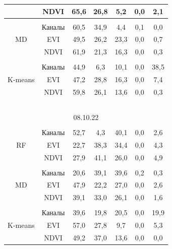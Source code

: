 \begin{table}
\begin{center}
\begin{tabular}{|c|c|c|c|c|c|c|}
&NDVI&65,6&26,8&\hphantom{9}5,2&0,0&2,1\\

\hline

&&&&&&\\[-10pt]

&Каналы&60,5&34,9&\hphantom{9}4,4&0,1&0,0\\

MD&EVI&49,5&26,2&23,3&0,0&0,7\\

&NDVI&61,9&21,3&16,3&0,0&0,3\\

\hline

&&&&&&\\[-10pt]

&Каналы&44,9&\hphantom{9}6,3&10,1&0,0&38,5\hphantom{9}\\

K-means&EVI&47,2&28,8&16,3&0,0&7,4\\

&NDVI&59,8&26,1&13,6&0,0&0,3\\

\hline

\multicolumn{7}{|c|}{\ }\\[-10pt]

\multicolumn{7}{|c|}{08.10.22}\\

\hline

&&&&&&\\[-10pt]

&Каналы&52,7&\hphantom{9}4,3&40,1&0,0&2,6\\

RF&EVI&22,7&38,3&34,4&0,0&4,3\\

&NDVI&27,9&41,1&26,0&0,0&4,9\\

\hline

&&&&&&\\[-10pt]

&Каналы&20,6&39,1&39,6&0,2&0,3\\

MD&EVI&47,9&22,2&27,0&0,0&2,6\\

&NDVI&39,1&33,0&26,1&0,0&1,6\\

\hline

&&&&&&\\[-10pt]

&Каналы&39,6&19,8&20,5&0,0&19,9\hphantom{9}\\

K-means&EVI&57,0&27,8&\hphantom{9}9,7&0,0&5,3\\

&NDVI&49,2&37,0&13,6&0,0&0,0\\

\hline

\end{tabular}

\end{center}

\end{table}


